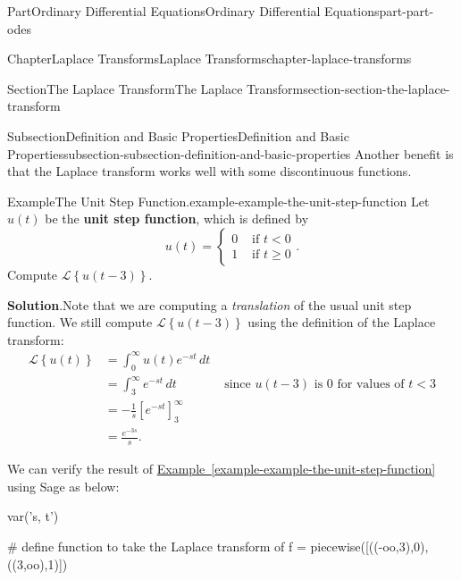 \documentclass[twoside,10pt,]{book}
\newcommand{\blocktitlefont}{\relax}
\newcommand{\xreffont}{\relax}
\newcommand{\terminology}[1]{\textbf{#1}}
\numberwithin{equation}{part}
\newcommand{\Laplace}[1]{\mathcal{L}\set{#1}}
\newcommand{\set}[1]{\left\{ #1 \right\}}
\newcommand{\lt}{<}
\newcommand{\amp}{&}
\begin{document}
\begin{partptx}{Part}{Ordinary Differential Equations}{}{Ordinary Differential Equations}{}{}{part-part-odes}
\begin{chapterptx}{Chapter}{Laplace Transforms}{}{Laplace Transforms}{}{}{chapter-laplace-transforms}
\begin{sectionptx}{Section}{The Laplace Transform}{}{The Laplace Transform}{}{}{section-section-the-laplace-transform}
\begin{subsectionptx}{Subsection}{Definition and Basic Properties}{}{Definition and Basic Properties}{}{}{subsection-subsection-definition-and-basic-properties}
Another benefit is that the Laplace transform works well with some discontinuous functions.%
\begin{example}{Example}{The Unit Step Function.}{example-example-the-unit-step-function}%
Let \(u(t)\) be the \terminology{unit step function}, which is defined by%
\begin{equation*}
u(t) = 
\begin{cases}
0 \amp\text{ if } t\lt 0\\
1 \amp\text{ if } t\geq0
\end{cases}\text{.}
\end{equation*}
Compute \(\Laplace{u(t-3)}\).%
\par\smallskip%
\noindent\textbf{\blocktitlefont Solution}.\hypertarget{solution-example-the-unit-step-function-c}{}\quad{}Note that we are computing a \emph{translation} of the usual unit step function. We still compute \(\Laplace{u(t-3)}\) using the definition of the Laplace transform:%
\begin{align*}
\Laplace{u(t)} &= \int_{0}^{\infty}u(t)e^{-st}\,dt\\
&= \int_{3}^{\infty}e^{-st}\,dt &\text{ since }u(t-3) \text{ is }0 \text{ for values of }t\lt3\\
&= -\frac{1}{s}\left[e^{-st}\right]_{3}^{\infty}\\
&= \frac{e^{-3s}}{s}\text{.}
\end{align*}
%
\end{example}
We can verify the result of \hyperref[example-example-the-unit-step-function]{Example~{\xreffont\ref{example-example-the-unit-step-function}}} using Sage as below: \begin{sageinput}
var('s, t')

# define function to take the Laplace transform of
f = piecewise([((-oo,3),0), ((3,oo),1)])


\end{sageinput}
\end{subsectionptx}
\end{sectionptx}
\end{chapterptx}
\end{partptx}
\end{document}
